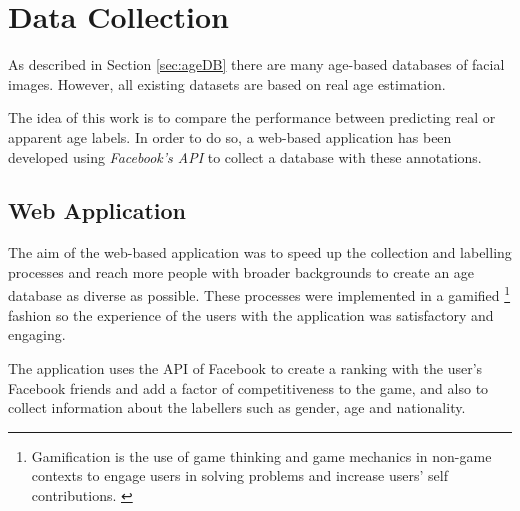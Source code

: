 \chapter{Data Collection} \label{chap:data}

As described in Section \ref{sec:ageDB} there are many age-based databases of facial images. However, all existing datasets are based on real age estimation. 

The idea of this work is to compare the performance between predicting real or apparent age labels. In order to do so, a web-based application has been developed using \textit{Facebook's API} to collect a database with these annotations.


\section{Web Application}

The aim of the web-based application was to speed up the collection and labelling processes and reach more people with broader backgrounds to create an age database as diverse as possible. These processes were implemented in a gamified \footnote{Gamification is the use of game thinking and game mechanics in non-game contexts to engage users in solving problems and increase users' self contributions. \cite{Deterding:2011:GDE:2181037.2181040}} fashion so the experience of the users with the application was satisfactory and engaging. 

The application uses the API of Facebook to create a ranking with the user's Facebook friends and add a factor of competitiveness to the game, and also to collect information about the labellers such as gender, age and nationality.

